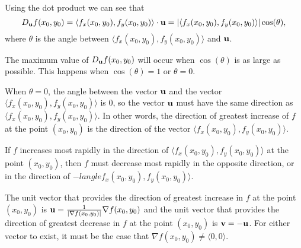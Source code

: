 \begin{activitySolution}
\ba 
\item Using the dot product we can see that
\[D_{\mathbf{u}} f(x_0,y_0) = \langle f_x(x_0,y_0), f_y(x_0,y_0) \rangle \cdot \mathbf{u} = |\langle f_x(x_0,y_0), f_y(x_0,y_0) \rangle| \cos(\theta),\]
where $\theta$ is the angle between $\langle f_x(x_0,y_0), f_y(x_0,y_0) \rangle$ and $\mathbf{u}$.

\item The maximum value of $D_{\mathbf{u}} f(x_0,y_0)$ will occur when $\cos(\theta)$ is as large as possible. This happens when $\cos(\theta) = 1$ or $\theta = 0$.

\item When $\theta = 0$, the angle between the vector $\mathbf{u}$ and the vector $\langle f_x(x_0,y_0), f_y(x_0,y_0) \rangle$ is 0, so the vector $\mathbf{u}$ must have the same direction as $\langle f_x(x_0,y_0), f_y(x_0,y_0) \rangle$. In other words, the direction of greatest increase of $f$ at the point $(x_0,y_0)$ is the direction of the vector $\langle f_x(x_0,y_0), f_y(x_0,y_0) \rangle$.

\item If $f$ increases most rapidly in the direction of $\langle f_x(x_0,y_0), f_y(x_0,y_0) \rangle$ at the point $(x_0,y_0)$, then $f$ must decrease most rapidly in the opposite direction, or in the direction of $-langle f_x(x_0,y_0), f_y(x_0,y_0) \rangle$.

\item The unit vector that provides the direction of greatest increase in $f$ at the point $(x_0,y_0)$ is $\mathbf{u}=\frac{1}{|\nabla f(x_0,y_0)|} \nabla f(x_0,y_0)$ and the unit vector that provides the direction of greatest decrease in $f$ at the point $(x_0,y_0)$ is $\mathbf{v} = -\mathbf{u}$. For either vector to exist, it must be the case that $\nabla f(x_0,y_0) \neq \langle 0,0 \rangle$. 
\ea

\end{activitySolution}
\aftera
